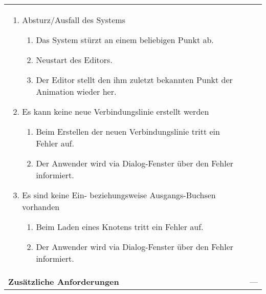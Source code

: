 \begin{longtabu}{p{0.5\textwidth}p{0.5\textwidth}}
\begin{enumerate}[label= (\alph*)]
            \item{Absturz/Ausfall des Systems
                \begin{enumerate}[label= (\roman*)]
                        \item{Das System stürzt an einem beliebigen Punkt
                                ab.}
                        \item{Neustart des Editors.}
                        \item{Der Editor stellt den ihm zuletzt bekannten
                                Punkt der Animation wieder her.}
                \end{enumerate}
            }
            \item{Es kann keine neue Verbindungslinie erstellt werden
                \begin{enumerate}[label= (\roman*)]
                    \item{Beim Erstellen der neuen Verbindungslinie tritt ein Fehler auf.}
                    \item{Der Anwender wird via Dialog-Fenster über den Fehler
                            informiert.}
                \end{enumerate}
            }
            \item{Es sind keine Ein- beziehungsweise Ausgangs-Buchsen vorhanden
                \begin{enumerate}[label= (\roman*)]
                    \item{Beim Laden eines Knotens tritt ein Fehler auf.}
                    \item{Der Anwender wird via Dialog-Fenster über den Fehler
                            informiert.}
                \end{enumerate}
            }
        \end{enumerate} \\
    \cmidrule(r){1-1}\cmidrule(lr){2-2}
        \textbf{Zusätzliche Anforderungen} &
        --- \\
    \bottomrule
\end{longtabu}
